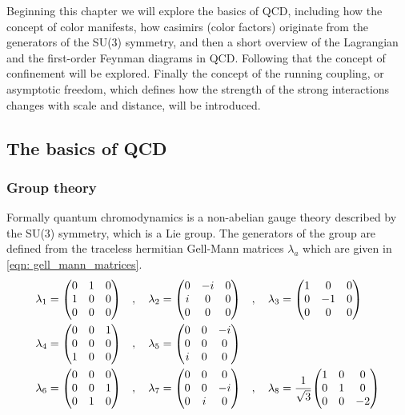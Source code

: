 \documentclass[main.tex]{subfiles}
\begin{document}
Beginning this chapter we will explore the basics of QCD, including how the concept of color manifests, how casimirs (color factors) originate from the generators of the SU(3) symmetry, and then a short overview of the Lagrangian and the first-order Feynman diagrams in QCD. Following that the concept of confinement will be explored. Finally the concept of the running coupling, or asymptotic freedom, which defines how the strength of the strong interactions changes with scale and distance, will be introduced.

\subsection{The basics of QCD}
\subsubsection*{Group theory}
Formally quantum chromodynamics is a non-abelian gauge theory described by the SU(3) symmetry, which is a Lie group. The generators of the group are defined from the traceless hermitian Gell-Mann matrices \(\lambda_a\) which are given in \autoref{eqn: gell_mann_matrices}. 
\begin{align}\label{eqn: gell_mann_matrices}
    \begin{split}
    \lambda_1 = \mqty(0&1&0\\1&0&0\\0&0&0) \quad, \quad \lambda_2 &= \mqty(0&-i&0\\i&0&0\\0&0&0) \quad, \quad \lambda_3 = \mqty(1&0&0\\0&-1&0\\0&0&0) \\
    \lambda_4 = \mqty(0&0&1\\0&0&0\\1&0&0) \quad, \quad \lambda_5 &= \mqty(0&0&-i\\0&0&0\\i&0&0)\\
    \lambda_6 = \mqty(0&0&0\\0&0&1\\0&1&0) \quad ,\quad \lambda_7 &= \mqty(0&0&0\\0&0&-i\\0&i&0) \quad, \quad \lambda_8 = \frac{1}{\sqrt{3}} \mqty(1&0&0\\0&1&0\\0&0&-2) 
    \end{split}
\end{align}
\end{document}
